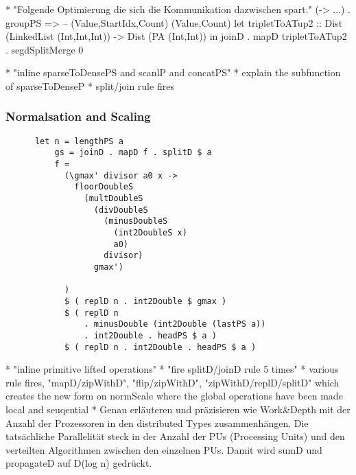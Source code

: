         
        
        * "Folgende Optimierung die sich die Kommunikation dazwischen spart."
          (\g -> ...) . groupPS
            =>                             -- (Value,StartIdx,Count)     (Value,Count)
          let tripletToATup2 :: Dist (LinkedList (Int,Int,Int)) -> Dist (PA (Int,Int))
          in joinD
             . mapD tripletToATup2
             . segdSplitMerge 0
        
        * "inline sparseToDensePS and scanlP and concatPS"
        * explain the subfunction of sparseToDenseP
        * split/join rule fires
      
      
      \subsubsection{Normalsation and Scaling}
      \begin{lstlisting}
      let n = lengthPS a
          gs = joinD . mapD f . splitD $ a
          f =
            (\gmax' divisor a0 x ->
              floorDoubleS
                (multDoubleS
                  (divDoubleS
                    (minusDoubleS
                      (int2DoubleS x)
                      a0)
                    divisor)
                  gmax')
              
            )
            $ ( replD n . int2Double $ gmax )
            $ ( replD n
                . minusDouble (int2Double (lastPS a))
                . int2Double . headPS $ a )
            $ ( replD n . int2Double . headPS $ a )
      \end{lstlisting}
      
      * "inline primitive lifted operations"
      * "fire splitD/joinD rule 5 times"
      * various rule fires, "mapD/zipWithD", "flip/zipWithD", "zipWithD/replD/splitD"
        which creates the new form on normScale where the global operations have been made local and seuqential
      * Genau erläuteren und präzisieren wie Work&Depth mit der Anzahl der Prozessoren in den distributed Types zusammenhängen.
          Die tatsächliche Parallelität steck in der Anzahl der PUs (Processing Units) und den verteilten Algorithmen
          zwischen den einzelnen PUs. Damit wird sumD und propagateD auf D(log n) gedrückt.
          
      
